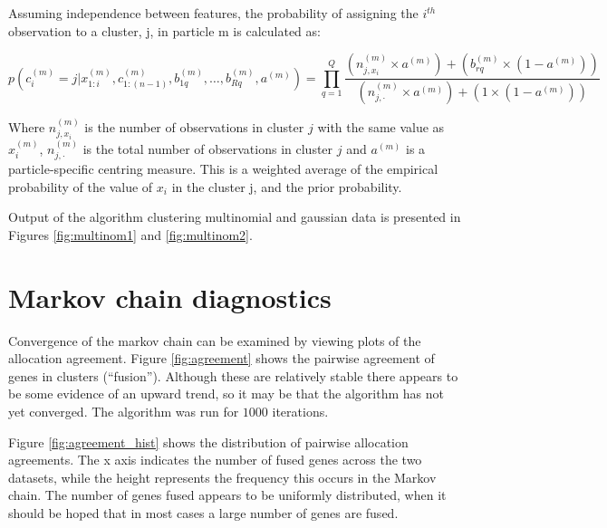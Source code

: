 \documentclass[10pt,a4paper]{article}
\begin{document}
Assuming independence between features, the probability of assigning the $i^{th}$ observation to a cluster, j, in particle m is calculated as:

\begin{equation}
p(c_{i}^{(m)} = j| x_{1:i}^{(m)}, c_{1:(n - 1)}^{(m)},b_{1q}^{(m)}, \dots, b_{Rq}^{(m)}, a^{(m)} ) = 
\prod_{q = 1}^{Q} 
\frac{(n_{j, x_i}^{(m)} \times a^{(m)}) + (b_{rq}^{(m)} \times (1 - a^{(m)}))}
{(n_{j, \cdot}^{(m)} \times a^{(m)}) + (1 \times (1 - a^{(m)}))}
\end{equation}

Where $n_{j, x_i}^{(m)}$ is the number of observations in cluster $j$ with the same value as $x_i^{(m)}$,  $n_{j, \cdot}^{(m)}$ is the total number of observations in cluster $j$ and $a^{(m)}$ is a particle-specific centring measure. This is a weighted average of the empirical probability  of the value of $x_{i}$ in the cluster j, and the prior probability.

Output of the algorithm clustering multinomial and gaussian data is presented in Figures \ref{fig:multinom1} and \ref{fig:multinom2}.


\section{Markov chain diagnostics}
Convergence of the markov chain can be examined by viewing plots of the allocation agreement. Figure \ref{fig:agreement} shows the pairwise agreement of genes in clusters (``fusion''). Although these are relatively stable there appears to be some evidence of an upward trend, so it may be that the algorithm has not yet converged. The algorithm was run for $1000$ iterations.

Figure \ref{fig:agreement_hist} shows the distribution of pairwise allocation agreements. The x axis indicates the number of fused genes across the two datasets, while the height represents the frequency this occurs in the Markov chain. The number of genes fused appears to be uniformly distributed, when it should be hoped that in most cases a large number of genes are fused.







\end{document}
